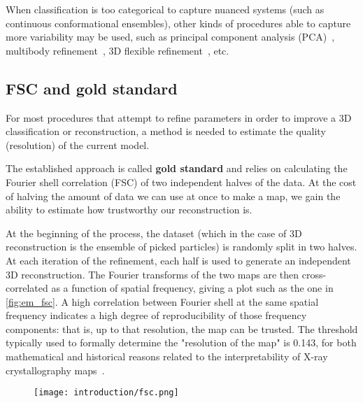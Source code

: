 When classification is too categorical to capture nuanced systems (such as continuous conformational ensembles), other kinds of procedures able to capture more variability may be used, such as principal component analysis (PCA)~\cite{castano-diezDynamoFlexibleUserfriendly2012,punjani3DVariabilityAnalysis2021}, multibody refinement~\cite{nakaneMultibodyRefinementCryoEM2021}, 3D flexible refinement~\cite{punjani3DFlexibleRefinement2022}, etc.

\subsection{FSC and gold standard}\label{em_fsc}
For most procedures that attempt to refine parameters in order to improve a 3D classification or reconstruction, a method is needed to estimate the quality (resolution) of the current model.

The established approach is called \textbf{gold standard} and relies on calculating the Fourier shell correlation (FSC) of two independent halves of the data.
At the cost of halving the amount of data we can use at once to make a map, we gain the ability to estimate how trustworthy our reconstruction is.

At the beginning of the process, the dataset (which in the case of 3D reconstruction is the ensemble of picked particles) is randomly split in two halves.
At each iteration of the refinement, each half is used to generate an independent 3D reconstruction.
The Fourier transforms of the two maps are then cross-correlated as a function of spatial frequency, giving a plot such as the one in \autoref{fig:em_fsc}.
A high correlation between Fourier shell at the same spatial frequency indicates a high degree of reproducibility of those frequency components: that is, up to that resolution, the map can be trusted.
The threshold typically used to formally determine the "resolution of the map" is 0.143, for both mathematical and historical reasons related to the interpretability of X-ray crystallography maps~\cite{rosenthalOptimalDeterminationParticle2003}.

\begin{figure}
    \centering
    \texttt{[image: introduction/fsc.png]}
    \label{fig:em_fsc}
\end{figure}

